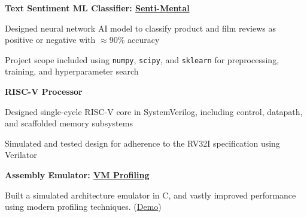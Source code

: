 \documentclass[10pt]{article}
\newenvironment{mylist}[1][]
{\itemize[nosep, wide=0pt, leftmargin=*, after=\strut]}
{\enditemize}
\begin{document}
\begin{minipage}[t]{\linewidth}
    \textbf{Text Sentiment ML Classifier: \href{https://github.com/liam-strand/cs135-projA}{Senti-Mental}}
    \begin{mylist}
        \item Designed neural network AI model to classify product and film reviews as positive or negative with $\approx$90\% accuracy
        \item Project scope included using \texttt{numpy}, \texttt{scipy}, and \texttt{sklearn} for preprocessing, training, and hyperparameter search
    \end{mylist}
\end{minipage}

\begin{minipage}[t]{\linewidth}
    \textbf{RISC-V Processor}
    \begin{mylist}
        \item Designed single-cycle RISC-V core in SystemVerilog, including control, datapath, and scaffolded memory subsystems
        \item Simulated and tested design for adherence to the RV32I specification using Verilator
    \end{mylist}
\end{minipage}

\begin{minipage}[t]{\linewidth}
    \textbf{Assembly Emulator: \href{https://github.com/liam-strand/comp-40-VM-Profiling}{VM Profiling}}
    \begin{mylist}
        \item Built a simulated architecture emulator in C, and vastly improved performance using modern profiling techniques. (\href{https://youtu.be/OnzkSmFvxiM}{Demo})
    \end{mylist}
\end{minipage}
\end{document}
